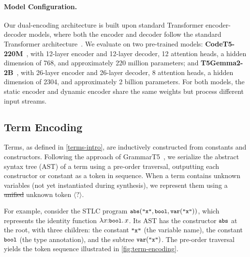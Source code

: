 \documentclass[manuscript,screen]{acmart}
\makeatletter
\newcommand{\tcode}[1]{{\small \texttt{\spaceskip=0.2em #1}}}
\providecommand{\DIFadd}[1]{{\protect\color{blue}\uwave{#1}}} %
\providecommand{\DIFdel}[1]{{\protect\color{red}\sout{#1}}} %
\providecommand{\DIFaddbegin}{} %
\providecommand{\DIFaddend}{} %
\providecommand{\DIFdelbegin}{} %
\providecommand{\DIFdelend}{} %
\providecommand{\DIFscaledelfig}{0.5}
\newlength{\DIFdelgraphicswidth} %
\newlength{\DIFdelgraphicsheight} %
\providecommand{\DIFaddincludegraphics}[2][]{{\color{blue}\fbox{\DIFOincludegraphics[#1]{#2}}}} %
\providecommand{\DIFdelincludegraphics}[2][]{%
\sbox{\DIFdelgraphicsbox}{\DIFOincludegraphics[#1]{#2}}%
\settoboxwidth{\DIFdelgraphicswidth}{\DIFdelgraphicsbox} %
\settoboxtotalheight{\DIFdelgraphicsheight}{\DIFdelgraphicsbox} %
\scalebox{\DIFscaledelfig}{%
\parbox[b]{\DIFdelgraphicswidth}{\usebox{\DIFdelgraphicsbox}\\[-\baselineskip] \rule{\DIFdelgraphicswidth}{0em}}\llap{\resizebox{\DIFdelgraphicswidth}{\DIFdelgraphicsheight}{%
\setlength{\unitlength}{\DIFdelgraphicswidth}%
\begin{picture}(1,1)%
\thicklines\linethickness{2pt} %
{\color[rgb]{1,0,0}\put(0,0){\framebox(1,1){}}}%
{\color[rgb]{1,0,0}\put(0,0){\line( 1,1){1}}}%
{\color[rgb]{1,0,0}\put(0,1){\line(1,-1){1}}}%
\end{picture}%
}\hspace*{3pt}}} %
} %
\DeclareRobustCommand{\DIFaddbegin}{\DIFOaddbegin \let\includegraphics\DIFaddincludegraphics} %
\DeclareRobustCommand{\DIFaddend}{\DIFOaddend \let\includegraphics\DIFOincludegraphics} %
\DeclareRobustCommand{\DIFdelbegin}{\DIFOdelbegin \let\includegraphics\DIFdelincludegraphics} %
\DeclareRobustCommand{\DIFdelend}{\DIFOaddend \let\includegraphics\DIFOincludegraphics} %
\let\sout@orig\sout %
\renewcommand{\sout}[1]{\ifmmode\text{\sout@orig{\ensuremath{#1}}}\else\sout@orig{#1}\fi} %
\makeatother
\begin{document}
\paragraph{Model Configuration.}
Our dual-encoding architecture is built upon standard Transformer encoder-decoder models, where both the encoder and decoder follow the standard Transformer architecture~\cite{DBLP:conf/nips/VaswaniSPUJGKP17}. We evaluate on two pre-trained models: \textbf{CodeT5-220M}~\cite{DBLP:conf/emnlp/0034WJH21}, with \DIFaddbegin \DIFadd{a }\DIFaddend 12-layer encoder and \DIFaddbegin \DIFadd{a }\DIFaddend 12-layer decoder, 12 attention heads, a hidden dimension of 768, and approximately 220 million parameters; and \textbf{T5Gemma2-2B}~\cite{zhang2025t5gemma2seeingreading}, with \DIFaddbegin \DIFadd{a }\DIFaddend 26-layer encoder and \DIFaddbegin \DIFadd{a }\DIFaddend 26-layer decoder, 8 attention heads, a hidden dimension of 2304, and approximately 2 billion parameters. For both models, the static encoder and dynamic encoder share the same weights but process different input streams.

\subsection{Term Encoding}
\label{sec:term-encoding}
Terms, as defined in \autoref{terms-intro}, are inductively constructed from constants and constructors. Following the approach of GrammarT5~\cite{DBLP:conf/icse/ZhuL000C24}, we serialize the abstract syntax tree (AST) of a term using a pre-order traversal, outputting each constructor or constant as a token in sequence. When a term contains unknown variables (not yet instantiated during synthesis), we represent them using a \DIFdelbegin \DIFdel{unified }\DIFdelend \DIFaddbegin \DIFadd{single shared }\DIFaddend unknown token $\langle?\rangle$.

For example, consider the STLC program $\tcode{abs}(\tcode{"x"}, \tcode{bool}, \tcode{var}(\tcode{"x"}))$, which represents the identity function $\lambda x{:}\tcode{bool}.\, x$. Its AST has the constructor $\tcode{abs}$ at the root, with three children: the constant $\tcode{"x"}$ (the variable name), the constant $\tcode{bool}$ (the type annotation), and the subtree $\tcode{var}(\tcode{"x"})$. The pre-order traversal yields the token sequence illustrated in \autoref{fig:term-encoding}.
\end{document}
